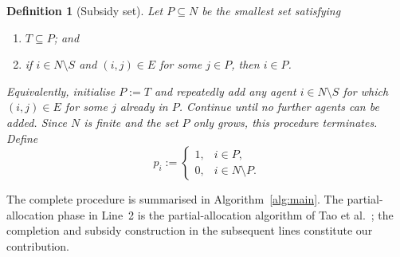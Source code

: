 \documentclass[sigconf,anonymous]{aamas}
\newcommand{\agents}{N}
\newcommand{\subsidy}{p}
\theoremstyle{acmplain}
\theoremstyle{acmdefinition}
\newtheorem{definition}[theorem]{Definition}
\theoremstyle{acmplain}
\begin{document}
\begin{definition}[Subsidy set]
\label{def:m-P}
Let $P\subseteq\agents$ be the smallest set satisfying
\begin{enumerate}
  \item[(P1)] $T\subseteq P$; and
  \item[(P2)] if $i\in\agents\setminus S$ and $(i,j)\in E$ for some
        $j\in P$, then $i\in P$.
\end{enumerate}
Equivalently, initialise $P:=T$ and repeatedly add any agent $i\in\agents\setminus S$ for which $(i,j)\in E$ for some $j$ already in $P$. Continue until no further agents can be added. Since $\agents$ is finite and the set $P$ only grows, this procedure terminates.
Define
\begin{equation}
\label{eq:m-subsidy}
  \subsidy_i :=
  \begin{cases}
    1, & i\in P,\\
    0, & i\in\agents\setminus P.
  \end{cases}
\end{equation}
\end{definition}

The complete procedure is summarised in Algorithm~\ref{alg:main}. The partial-allocation phase in Line~2 is the partial-allocation algorithm of Tao et al.~\cite{tao2025existence}; the completion and subsidy construction in the subsequent lines constitute our contribution.
\end{document}
